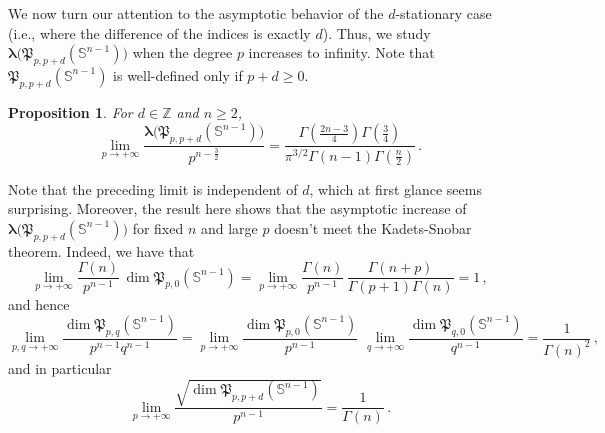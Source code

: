 \documentclass[12pt]{amsart}
\numberwithin{subsection}{section}
\newtheorem{proposition}[theorem]{Proposition}
\theoremstyle{definition}
\theoremstyle{remark}
\begin{document}
\smallskip

We now turn our attention to the asymptotic behavior of the $d$-stationary case (i.e., where the difference of the indices is exactly $d$). Thus, we study \( \boldsymbol{\lambda}\big(\mathfrak{P}_{p,p+d}(\mathbb{S}^{n-1})\big) \) when the degree \( p \) increases to infinity. Note that \( \mathfrak{P}_{p,p+d}(\mathbb{S}^{n-1}) \) is well-defined only if \( p + d \geq 0 \).

\begin{proposition} \label{end}
For \( d \in \mathbb{Z} \) and \( n \ge 2 \),
\[\lim_{p \to + \infty}  \frac{\boldsymbol{\lambda}\big(\mathfrak{P}_{p,p+d}(\mathbb{S}^{n-1})\big)}{p^{n- \frac{3}{2}}}  =\frac{\Gamma\left(\frac{2n - 3}{4}\right)\Gamma \left(\frac{3}{4}\right)}{\pi^{3/2}\Gamma(n-1)  \Gamma\left(\frac{n}{2}\right)}\,.\]
\end{proposition}


  \smallskip
 \noindent  Note that the preceding limit is independent of  $d $, which at first glance seems surprising.
Moreover, the result here shows that the asymptotic increase of  $\boldsymbol{\lambda}\big(\mathfrak{P}_{p,p+d}(\mathbb{S}^{n-1})\big) $ for fixed  $n $ and large  $p $ doesn't meet the Kadets-Snobar theorem. Indeed, we have that
\[
\lim_{p \to + \infty}  \frac{\Gamma(n)}{p^{n-1}}\,\dim \mathfrak{P}_{p,0}(\mathbb{S}^{n-1})
=
\lim_{p \to + \infty}
 \frac{\Gamma(n)}{p^{n-1}}\,
\frac{\Gamma(n+p)}{\Gamma(p+1) \Gamma(n)}
=1\,,
\]
and hence
\[
\lim_{p,q \to + \infty}  \frac{\dim \mathfrak{P}_{p,q}(\mathbb{S}^{n-1})}{p^{n-1} q^{n-1}}
=
\lim_{p \to + \infty}  \frac{\dim \mathfrak{P}_{p,0}(\mathbb{S}^{n-1})}{p^{n-1} }\,\,
\lim_{q \to + \infty}  \frac{\dim \mathfrak{P}_{q,0}(\mathbb{S}^{n-1})}{q^{n-1} }
=
\frac{1}{\Gamma(n)^2}\,,
\]
and in particular
\[
\lim_{p \to + \infty}  \frac{\sqrt{\dim \mathfrak{P}_{p,p+d}(\mathbb{S}^{n-1})}}{p^{n-1} }=
\frac{1}{\Gamma(n)}\,.
\]
\end{document}

